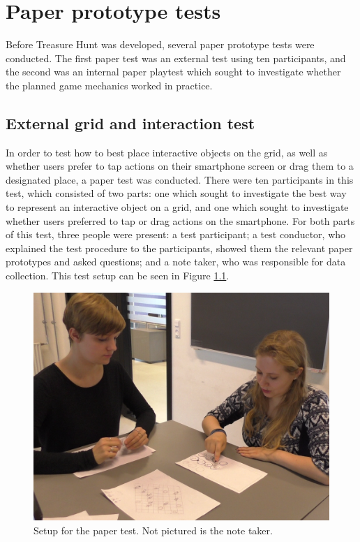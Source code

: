 \chapter{Paper prototype tests}\label{ch:paperPlaytest}
Before Treasure Hunt was developed, several paper prototype tests were conducted. The first paper test was an external test using ten participants, and the second was an internal paper playtest which sought to investigate whether the planned game mechanics worked in practice.

\section{External grid and interaction test}
In order to test how to best place interactive objects on the grid, as well as whether users prefer to tap actions on their smartphone screen or drag them to a designated place, a paper test was conducted. There were ten participants in this test, which consisted of two parts: one which sought to investigate the best way to represent an interactive object on a grid, and one which sought to investigate whether users preferred to tap or drag actions on the smartphone. For both parts of this test, three people were present: a test participant; a test conductor, who explained the test procedure to the participants, showed them the relevant paper prototypes and asked questions; and a note taker, who was responsible for data collection. This test setup can be seen in Figure \ref{fig:papersetup}.

\begin{figure}[h!]
	\centering
	\includegraphics[width=\textwidth / 2]{figures/PaperTestSetup.png}
	\caption{Setup for the paper test. Not pictured is the note taker. \label{fig:papersetup}}
\end{figure}

